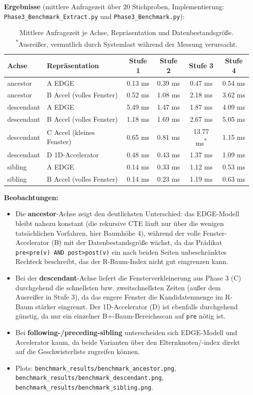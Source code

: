 \documentclass[11pt]{scrartcl}
\begin{document}
\textbf{Ergebnisse} (mittlere Anfragezeit über 20 Stichproben, Implementierung: \texttt{Phase3\_Benchmark\_Extract.py} und \texttt{Phase3\_Benchmark.py}):

\begin{table}[h]
	\centering
	\begin{tabular}{l l c c c c}
		\toprule
		Achse & Repräsentation & Stufe 1 & Stufe 2 & Stufe 3 & Stufe 4 \\
		\midrule
		ancestor   & A EDGE              & 0.13 ms & 0.39 ms & 0.47 ms  & 0.54 ms \\
		ancestor   & B Accel (volles Fenster) & 0.52 ms & 1.08 ms & 2.18 ms  & 3.62 ms \\
		\midrule
		descendant & A EDGE              & 5.49 ms & 1.47 ms & 1.87 ms  & 4.09 ms \\
		descendant & B Accel (volles Fenster) & 1.18 ms & 1.69 ms & 2.67 ms  & 5.05 ms \\
		descendant & C Accel (kleines Fenster) & 0.65 ms & 0.81 ms & 13.77 ms\textsuperscript{*} & 1.15 ms \\
		descendant & D 1D-Accelerator    & 0.48 ms & 0.43 ms & 1.37 ms  & 1.09 ms \\
		\midrule
		sibling    & A EDGE              & 0.14 ms & 0.33 ms & 1.12 ms  & 0.53 ms \\
		sibling    & B Accel (volles Fenster) & 0.14 ms & 0.23 ms & 1.19 ms  & 0.63 ms \\
		\bottomrule
	\end{tabular}
	\caption{Mittlere Anfragezeit je Achse, Repräsentation und Datenbestandsgröße. \textsuperscript{*}Ausreißer, vermutlich durch Systemlast während der Messung verursacht.}
\end{table}

\textbf{Beobachtungen:}
\begin{itemize}
  \item Die \textbf{ancestor}-Achse zeigt den deutlichsten Unterschied: das EDGE-Modell bleibt nahezu konstant (die rekursive CTE läuft nur über die wenigen tatsächlichen Vorfahren, hier Baumhöhe 4), während der volle Fenster-Accelerator (B) mit der Datenbestandsgröße wächst, da das Prädikat \texttt{pre<pre(v) AND post>post(v)} ein nach beiden Seiten unbeschränktes Rechteck beschreibt, das der R-Baum-Index nicht gut eingrenzen kann.
  \item Bei der \textbf{descendant}-Achse liefert die Fensterverkleinerung aus Phase 3 (C) durchgehend die schnellsten bzw. zweitschnellsten Zeiten (außer dem Ausreißer in Stufe 3), da das engere Fenster die Kandidatenmenge im R-Baum stärker eingrenzt. Der 1D-Accelerator (D) ist ebenfalls durchgehend günstig, da nur ein einzelner B+-Baum-Bereichsscan auf \texttt{pre} nötig ist.
  \item Bei \textbf{following-/preceding-sibling} unterscheiden sich EDGE-Modell und Accelerator kaum, da beide Varianten über den Elternknoten/-index direkt auf die Geschwisterliste zugreifen können.
  \item Plots: \texttt{benchmark\_results/benchmark\_ancestor.png}, \texttt{benchmark\_results/benchmark\_descendant.png}, \texttt{benchmark\_results/benchmark\_sibling.png}.
\end{itemize}
\end{document}

